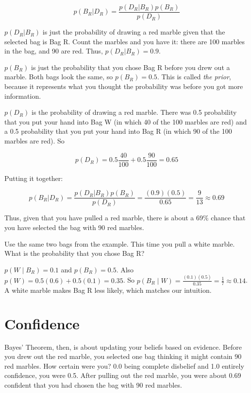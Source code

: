 $$p(B_R | D_R) = \frac{ p(D_R | B_R) p(B_R) } {p(D_R)}$$

$p(D_R | B_R)$ is just the probability of drawing a red marble given that the
selected bag is Bag R. Count the marbles and you have it: there are 100
marbles in the bag, and 90 are red. Thus, $p(D_R | B_R) = 0.9$.

$p(B_R)$ is just the probability that you chose Bag R before you drew
out a marble. Both bags look the same, so $p(B_R)= 0.5$. This is
called \textit{the prior}, because it represents what you thought the
probability was before you got more information.

$p(D_R)$ is the probability of drawing a red marble. There was 0.5
probability that you put your hand into Bag W (in which 40 of the 100
marbles are red) and a 0.5 probability that you put your hand into Bag
R (in which 90 of the 100 marbles are red).  So

$$p(D_R) = 0.5 \frac{40}{100} + 0.5 \frac{90}{100} = 0.65$$

Putting it together:

$$p(B_R | D_R) = \frac{ p(D_R | B_R) p(B_R) } {p(D_R)} = \frac{(0.9)(0.5)}{0.65} = \frac{9}{13} \approx 0.69$$

Thus, given that you have pulled a red marble, there is about a 69\% chance
that you have selected the bag with 90 red marbles.

\begin{Exercise}[label=bayes1, title=A white marble]
Use the same two bags from the example. This time you pull a white marble. What is the probability that you chose Bag R?
\end{Exercise}
\begin{Answer}[ref=bayes1]
$p(W \mid B_R) = 0.1$ and $p(B_R) = 0.5$. Also $p(W) = 0.5(0.6) + 0.5(0.1) = 0.35$. So $p(B_R \mid W) = \frac{(0.1)(0.5)}{0.35} = \frac{1}{7} \approx 0.14$. A white marble makes Bag R less likely, which matches our intuition.
\end{Answer}

\section{Confidence}

Bayes' Theorem, then, is about updating your beliefs based on
evidence.  Before you drew out the red marble, you selected one bag
thinking it might contain 90 red marbles. How certain were you? 0.0 being complete disbelief and 1.0 entirely
confidence, you were 0.5. After pulling out the red marble, you were about 0.69
confident that you had chosen the bag with 90 red marbles.

